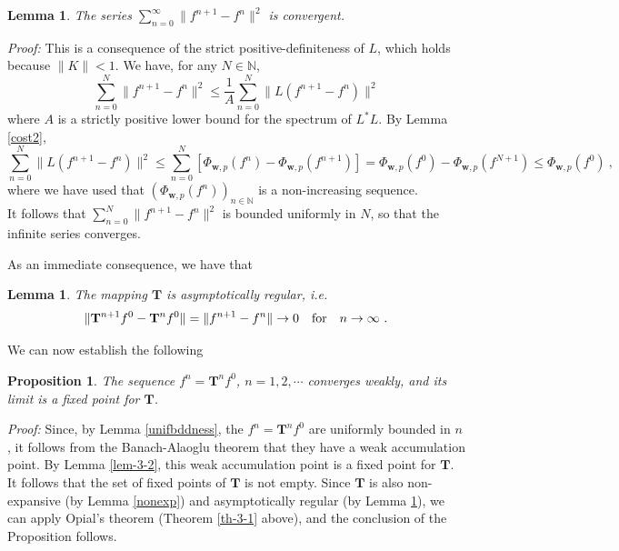 \documentclass[10pt]{article}
\newtheorem{proposition}[theorem]{Proposition}
\newtheorem{lemma}[theorem]{Lemma}
\newcommand{\QED}{\hfill \raisebox{-2pt}{\rule{5.6pt}{8pt}\rule{4pt}{0pt}}%
  \smallskip\par}
\def\N{\mathbb{N}}
\def\T{\mathbf{T}}
\begin{document}
\begin{lemma}
\label{series}
The
series
$\sum_{n=0}^\infty \| f^{n+1}-f^n\|^2 $ is convergent.
\end{lemma}
{\em Proof:} This is a consequence of the strict positive-definiteness of $L$,
which holds because $\|K\| <1$. We have, for any $N \in \N$,
\begin{equation*}
\sum_{n=0}^N \| f^{n+1}-f^n\|^2 \leq \frac{1}{A} \sum_{n=0}^N
\| L(f^{n+1}-f^n)\|^2
\end{equation*}
where $A$ is a strictly positive lower bound for the spectrum of $L^*L$.
By Lemma \ref{cost2},
\begin{equation*}
\sum_{n=0}^{N}
\| L(f^{n+1}-f^n)\|^2 \leq
\sum_{n=0}^N [\Phi_{\mathbf{w},p}(f^n)-\Phi_{\mathbf{w},p}(f^{n+1})]
= \Phi_{\mathbf{w},p}(f^{0})-\Phi_{\mathbf{w},p}(f^{N+1}) \leq
\Phi_{\mathbf{w},p}(f^{0})~,
\end{equation*}
where we have used that
$(\Phi_{\mathbf{w},p}(f^n))_{n \in \N}$ is a non-increasing sequence. \\
It follows
that $\sum_{n=0}^N \| f^{n+1}-f^n\|^2 $ is bounded uniformly in $N$, so that
the infinite series converges.\hfill \QED

\bigskip

As an immediate consequence, we have that
\begin{lemma}
\label{asyreg}
The mapping ${\T}$ is asymptotically regular, i.e.
\begin{equation*}
\|{\T}^{n+1}f^0 -{\T}^n f^0 \| =
\| f^{n+1} - f^n \| \to 0 \quad {\rm for} \quad n \to \infty\ .
\end{equation*}
\end{lemma}
We can now establish the following
\begin{proposition}
The sequence $f^n={\T}^nf^0$,
$n=1, 2, \cdots$ converges weakly, and its limit is a fixed point for $\T$.
\end{proposition}
{\em Proof:} Since, by Lemma \ref{unifbddness}, the $f^n={\T}^n f^0$
are uniformly bounded in $n$, it follows from the Banach-Alaoglu
theorem that they have a weak accumulation point. By Lemma \ref{lem-3-2},
this weak accumulation point is a fixed point for $\T$.
It follows that the set of fixed points of $\T$ is not empty.
Since $\T$ is also non-expansive (by Lemma \ref{nonexp}) and
asymptotically regular (by Lemma \ref{asyreg}),
we can apply Opial's theorem (Theorem \ref{th-3-1} above), and the
conclusion of the Proposition follows.
\hfill\QED

\bigskip
\end{document}
